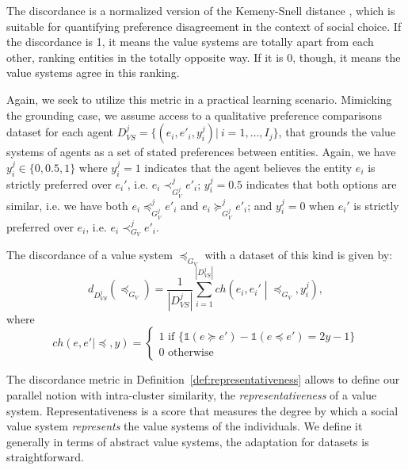 \documentclass{ecai}
\newcommand{\abs}[1]{{\left|#1\right|}}
\begin{document}
The discordance is a normalized version of the Kemeny-Snell distance \cite{kemeny1962preference}, which is suitable for quantifying preference disagreement in the context of social choice. If the discordance is 1, it means the value systems are totally apart from each other, ranking entities in the totally opposite way. If it is 0, though, it means the value systems agree in this ranking.

Again, we seek to utilize this metric in a practical learning scenario. Mimicking the grounding case, we assume access to a qualitative preference comparisons dataset for each agent $D_{VS}^j = \{(e_i, e'_i, y^j_i) |\ i=1, \dots, I_{j}\}$, that grounds the value systems of agents as a set of stated preferences between entities. Again, we have $y_i^j \in \{0,0.5,1\}$ where $y_i^j = 1$ indicates that the agent believes the entity $e_i$ is strictly preferred over $e_i'$, i.e. $e_i \prec_{G^j_V}^j e'_i$; $y_i^j=0.5$ indicates that both options are similar, i.e. we have both $e_i \preccurlyeq_{G^j_V}^j e'_i$ and $e_i \succcurlyeq_{G^j_V}^j e'_i$; and $y_i^j=0$ when $e_i'$ is strictly preferred over $e_i$, i.e.  $e_i \prec_{G_V}^j e'_i$. 

The discordance of a value system $\preccurlyeq_{G_V}$ with a dataset of this kind is given by:
$$d_{D_{VS}^j}\left(\preccurlyeq_{G_V}\right) = \frac{1}{\abs{D_{VS}^j}}\sum_{i=1}^\abs{D_{VS}^j}ch\left(e_i,e_i'\middle|\preccurlyeq_{G_V},y_i^j\right),$$ 
where
$$ch(e,e'|\preccurlyeq,y) = \begin{cases}
    1 \text{ if }\{\mathds{1}\left(e \succcurlyeq e'\right)-\mathds{1}\left(e \preccurlyeq e'\right)=2y-1\}\\
    0 \text{ otherwise}
\end{cases}$$


The discordance metric in Definition~\ref{def:representativeness} allows to define our parallel notion with intra-cluster similarity, the \textit{representativeness} of a value system. Representativeness is a score that measures the degree by which a social value system \textit{represents} the value systems of the individuals. We define it generally in terms of abstract value systems, the adaptation for datasets is straightforward.
\end{document}
